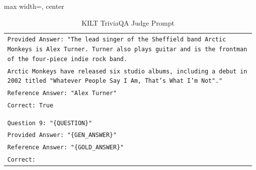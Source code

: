\documentclass[11pt]{article}
\begin{document}
\begin{table}[ht]
\begin{adjustbox}{max width=\textwidth, center}
\begin{tabular}{>{\raggedright\arraybackslash\tt}p{}<{}}
Provided Answer: "The lead singer of the Sheffield band Arctic Monkeys is Alex Turner. Turner also plays guitar and is the frontman of the four-piece indie rock band.\\
Arctic Monkeys have released six studio albums, including a debut in 2002 titled "Whatever People Say I Am, That's What I'm Not"."\\
Reference Answer: "Alex Turner"\\
Correct: True\\
\\
\\
Question 9: "\{QUESTION\}"\\
Provided Answer: "\{GEN\_ANSWER\}"\\
Reference Answer: "\{GOLD\_ANSWER\}"\\
Correct:\\
        \bottomrule
    \end{tabular}
    \end{adjustbox}

    \caption{
    KILT TriviaQA Judge Prompt
    }
    \label{tab:triviaqa_kilt_prompt}
\end{table}
\end{document}
